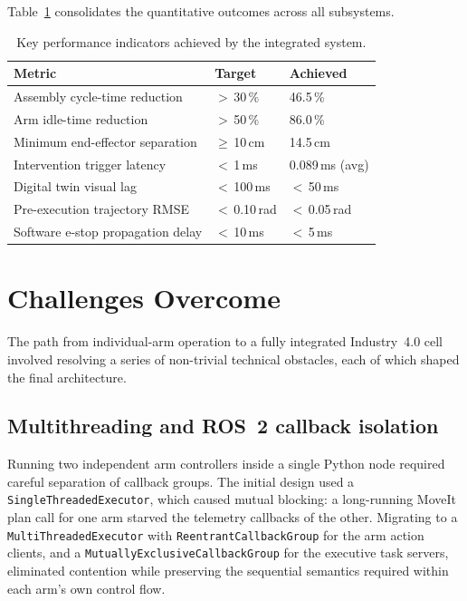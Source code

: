 Table~\ref{tab:ch9_kpi_summary} consolidates the quantitative outcomes across all subsystems.

\begin{table}[H]
\centering
\caption{Key performance indicators achieved by the integrated system.}
\label{tab:ch9_kpi_summary}
\setlength{\tabcolsep}{5pt}
\begin{tabular}{lll}
\toprule
\textbf{Metric}                         & \textbf{Target}    & \textbf{Achieved}         \\
\midrule
Assembly cycle-time reduction           & $>$\,30\,\%        & 46.5\,\%                  \\
Arm idle-time reduction                 & $>$\,50\,\%        & 86.0\,\%                  \\
Minimum end-effector separation         & $\geq$\,10\,cm     & 14.5\,cm                  \\
Intervention trigger latency            & $<$\,1\,ms         & 0.089\,ms (avg)           \\
Digital twin visual lag                 & $<$\,100\,ms       & $<$\,50\,ms               \\
Pre-execution trajectory RMSE           & $<$\,0.10\,rad     & $<$\,0.05\,rad            \\
Software e-stop propagation delay       & $<$\,10\,ms        & $<$\,5\,ms                \\
\bottomrule
\end{tabular}
\end{table}

\section{Challenges Overcome}
\label{sec:challenges}

The path from individual-arm operation to a fully integrated Industry~4.0 cell involved
resolving a series of non-trivial technical obstacles, each of which shaped the final
architecture.

\subsection{Multithreading and ROS~2 callback isolation}
Running two independent arm controllers inside a single Python node required careful separation
of callback groups.  The initial design used a \texttt{SingleThreadedExecutor}, which caused
mutual blocking: a long-running MoveIt plan call for one arm starved the telemetry callbacks of
the other.  Migrating to a \texttt{MultiThreadedExecutor} with \texttt{ReentrantCallbackGroup}
for the arm action clients, and a \texttt{MutuallyExclusiveCallbackGroup} for the executive task
servers, eliminated contention while preserving the sequential semantics required within each
arm's own control flow.

